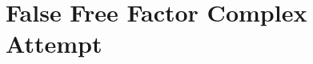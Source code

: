 \documentclass[12pt]{article}
\newcommand{\cev}[1]{\reflectbox{\ensuremath{\vec{\reflectbox{\ensuremath{#1}}}}}}
\begin{document}

\newpage
\section{False Free Factor Complex Attempt}
\end{document}
